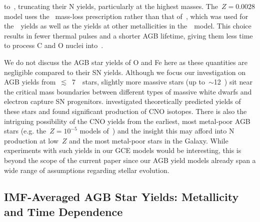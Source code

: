 to~\karakasten, truncating their N yields, 
particularly at the highest masses.
The~$Z = 0.0028$ model uses the~\citet{Bloecker1995} mass-loss prescription
rather than that of~\citet{Vassiliadis1993}, which was used for
the~\karakasten~yields as well as the yields at other metallicities in
the~\karakas~model.
This choice results in fewer thermal pulses and a shorter AGB lifetime, giving
them less time to process C and O nuclei into~\Nfourteen.
\par
We do not discuss the AGB star yields of
O and Fe here as these quantities are negligible compared to their SN yields.
Although we focus our investigation on AGB yields from~$\lesssim$~7~\msun~stars,
slightly more massive stars (up to~$\sim$12~\msun) sit near the critical mass
boundaries between different types of massive white dwarfs and electron capture
SN progenitors.
\citet{Doherty2017} investigated theoretically predicted yields of these stars
and found significant production of CNO isotopes.
There is also the intriguing possibility of the CNO yields from the earliest,
most metal-poor AGB stars (e.g. the~$Z = 10^{-5}$ models
of~\citealp{Gil-Pons2013, Gil-Pons2021}) and the insight this may afford into
N production at low~$Z$ and the most metal-poor stars in the Galaxy.
While experiments with such yields in our GCE models would be interesting, this
is beyond the scope of the current paper since our AGB yield models already
span a wide range of assumptions regarding stellar evolution.



\subsection{IMF-Averaged AGB Star Yields: Metallicity and Time Dependence}
\label{ohno:sec:yields:imf_agb}

